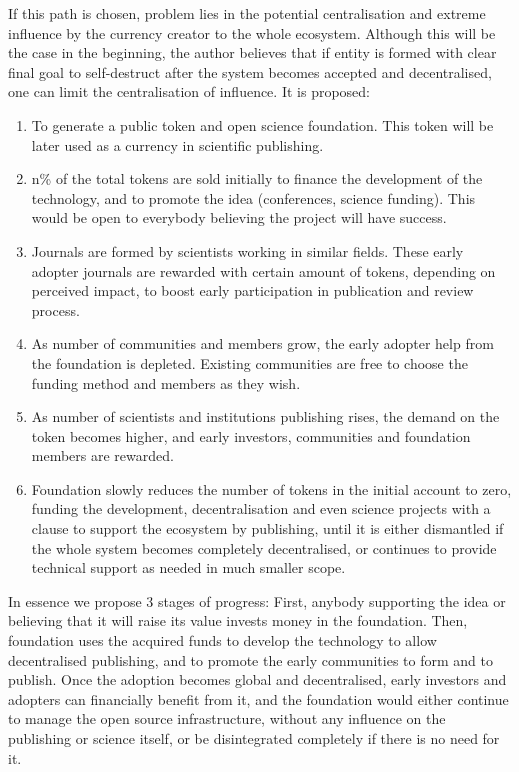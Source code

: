 \documentclass[12pt, a4paper]{article}
\begin{document}
If this path is chosen, problem lies in the potential centralisation and extreme influence by the currency creator to the whole ecosystem. Although this will be the case in the beginning, the author believes that if entity is formed with clear final goal to self-destruct after the system becomes accepted and decentralised, one can limit the centralisation of influence. It is proposed:
\begin{enumerate}
	\item To generate a public token and open science foundation. This token will be later used as a currency in scientific publishing.
	\item n\% of the total tokens are sold initially to finance the development of the technology, and to promote the idea (conferences, science funding). This would be open to everybody believing the project will have success.
	\item Journals are formed by scientists working in similar fields. These early adopter journals are rewarded with certain amount of tokens, depending on perceived impact, to boost early participation in publication and review process.
	\item As number of communities and members grow, the early adopter help from the foundation is depleted. Existing communities are free to choose the funding method and members as they wish. 
	\item As number of scientists and institutions publishing rises, the demand on the token becomes higher, and early investors, communities and foundation members are rewarded.
	\item Foundation slowly reduces the number of tokens in the initial account to zero, funding the development, decentralisation and even science projects with a clause to support the ecosystem by publishing, until it is either dismantled if the whole system becomes completely decentralised, or continues to provide technical support as needed in much smaller scope.
\end{enumerate}

In essence we propose 3 stages of progress: First, anybody supporting the idea or believing that it will raise its value invests money in the foundation. Then, foundation uses the acquired funds to develop the technology to allow decentralised publishing, and to promote the early communities to form and to publish. Once the adoption becomes global and decentralised, early investors and adopters can financially benefit from it, and the foundation would either continue to manage the open source infrastructure, without any influence on the publishing or science itself, or be disintegrated completely if there is no need for it.
\end{document}

